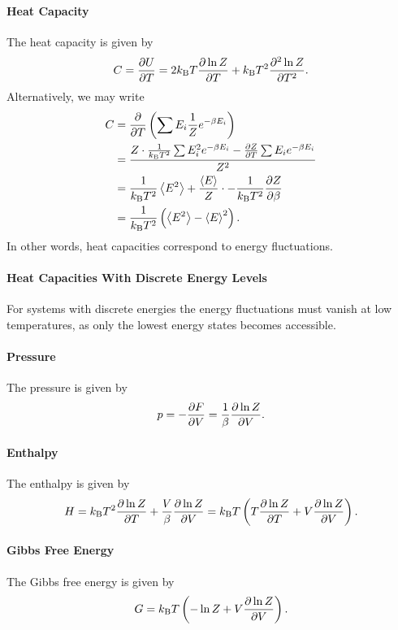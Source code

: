 \paragraph{Heat Capacity}
The heat capacity is given by
\begin{align*}
	C = \pdv{U}{T} = 2k_{\text{B}} T\pdv{\ln{Z}}{T} + k_{\text{B}} T^{2}\pdv[2]{\ln{Z}}{T}.
\end{align*}
Alternatively, we may write
\begin{align*}
	C &= \pdv{T}\left(\sum E_{i}\frac{1}{Z}e^{-\beta E_{i}}\right) \\
	  &= \frac{Z\cdot\frac{1}{k_{\text{B}} T^{2}}\sum E_{i}^{2}e^{-\beta E_{i}} - \pdv{Z}{T}\sum E_{i}e^{-\beta E_{i}}}{Z^{2}} \\
	  &= \frac{1}{k_{\text{B}} T^{2}}\expval{E^{2}} + \frac{\expval{E}}{Z}\cdot -\frac{1}{k_{\text{B}} T^{2}}\pdv{Z}{\beta} \\
	  &= \frac{1}{k_{\text{B}} T^{2}}\left(\expval{E^{2}} - \expval{E}^{2}\right).
\end{align*}
In other words, heat capacities correspond to energy fluctuations.

\paragraph{Heat Capacities With Discrete Energy Levels}
For systems with discrete energies the energy fluctuations must vanish at low temperatures, as only the lowest energy states becomes accessible.

\paragraph{Pressure}
The pressure is given by
\begin{align*}
	p = -\pdv{F}{V} = \frac{1}{\beta}\pdv{\ln{Z}}{V}.
\end{align*}

\paragraph{Enthalpy}
The enthalpy is given by
\begin{align*}
	H = k_{\text{B}} T^{2}\pdv{\ln{Z}}{T} + \frac{V}{\beta}\pdv{\ln{Z}}{V} = k_{\text{B}} T\left(T\pdv{\ln{Z}}{T} + V\pdv{\ln{Z}}{V}\right).
\end{align*}

\paragraph{Gibbs Free Energy}
The Gibbs free energy is given by
\begin{align*}
	G = k_{\text{B}} T\left(-\ln{Z} + V\pdv{\ln{Z}}{V}\right).
\end{align*}

